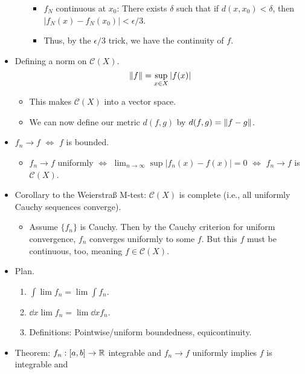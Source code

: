 \documentclass[../notes.tex]{subfiles}
\begin{document}
\begin{itemize}
\begin{itemize}
\begin{itemize}
            \item $f_N$ continuous at $x_0$: There exists $\delta$ such that if $d(x,x_0)<\delta$, then $|f_N(x)-f_N(x_0)|<\epsilon/3$.
            \item Thus, by the $\epsilon/3$ trick, we have the continuity of $f$.
        \end{itemize}
    \end{itemize}
    \item Defining a norm on $\mathcal{C}(X)$.
    \begin{equation*}
        \norm{f} = \sup_{x\in X}|f(x)|
    \end{equation*}
    \begin{itemize}
        \item This makes $\mathcal{C}(X)$ into a vector space.
        \item We can now define our metric $d(f,g)$ by $d(f,g)=\norm{f-g}$.
    \end{itemize}
    \item $f_n\to f$ $\Longleftrightarrow$ $f$ is bounded.
    \begin{itemize}
        \item $f_n\to f$ uniformly $\Longleftrightarrow$ $\lim_{n\to\infty}\sup|f_n(x)-f(x)|=0$ $\Longleftrightarrow$ $f_n\to f$ is $\mathcal{C}(X)$.
    \end{itemize}
    \item Corollary to the Weierstra{\ss} M-test: $\mathcal{C}(X)$ is complete (i.e., all uniformly Cauchy sequences converge).
    \begin{itemize}
        \item Assume $\{f_n\}$ is Cauchy. Then by the Cauchy criterion for uniform convergence, $f_n$ converges uniformly to some $f$. But this $f$ must be continuous, too, meaning $f\in\mathcal{C}(X)$.
    \end{itemize}
    \item {}Plan.
    \begin{enumerate}
        \item $\int\lim f_n=\lim\int f_n$.
        \item $\dd{x}\lim f_n=\lim\dd{x}f_n$.
        \item Definitions: Pointwise/uniform boundedness, equicontinuity.
    \end{enumerate}
    \item Theorem: $f_n:[a,b]\to\mathbb{R}$ integrable and $f_n\to f$ uniformly implies $f$ is integrable and
    \begin{equation*}

\end{equation*}
\end{itemize}
\end{document}
